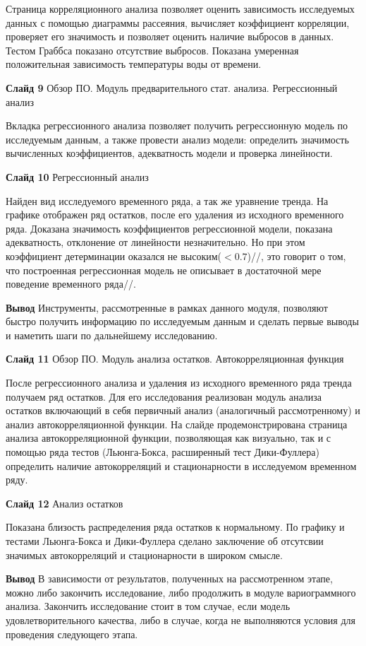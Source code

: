 \documentclass[a4paper,10pt]{report}
\begin{document}
Страница корреляционного анализа позволяет оценить зависимость исследуемых данных с помощью диаграммы рассеяния, вычисляет коэффициент корреляции, проверяет его значимость и позволяет оценить наличие выбросов в данных. Тестом Граббса показано отсутствие выбросов. Показана умеренная положительная зависимость температуры воды от времени.

\textbf{Слайд 9} Обзор ПО. Модуль предварительного стат. анализа. Регрессионный анализ

Вкладка регрессионного анализа позволяет получить регрессионную модель по исследуемым данным, а также провести анализ модели: определить значимость вычисленных коэффициентов, адекватность модели и проверка линейности.

\textbf{Слайд 10} Регрессионный анализ

Найден вид исследуемого временного ряда, а так же уравнение тренда. На графике отображен ряд остатков, после его удаления из исходного временного ряда. Доказана значимость коэффициентов регрессионной модели, показана адекватность, отклонение от линейности незначительно. Но при этом коэффициент детерминации оказался не высоким($<0.7$)//, это говорит о том, что построенная регрессионная модель не описывает в достаточной мере поведение временного ряда//.

\textbf{Вывод} Инструменты, рассмотренные в рамках данного модуля, позволяют быстро получить информацию по исследуемым данным и сделать первые выводы и наметить шаги по дальнейшему исследованию.

\textbf{Слайд 11} Обзор ПО. Модуль анализа остатков. Автокорреляционная функция

После регрессионного анализа и удаления из исходного временного ряда тренда получаем ряд остатков. Для его исследования реализован модуль анализа остатков включающий в себя первичный анализ (аналогичный рассмотренному) и анализ автокорреляционной функции. На слайде продемонстрирована страница анализа автокорреляционной функции, позволяющая как визуально, так и с помощью ряда тестов (Льюнга-Бокса, расширенный тест Дики-Фуллера) определить наличие автокорреляций и стационарности в исследуемом временном ряду.

\textbf{Слайд 12} Анализ остатков

Показана близость распределения ряда остатков к нормальному. По графику и тестами Льюнга-Бокса и Дики-Фуллера сделано заключение об отсутсвии значимых автокорреляций и стационарности в широком смысле.

\textbf{Вывод} В зависимости от результатов, полученных на рассмотренном этапе, можно либо закончить исследование, либо продолжить в модуле вариограммного анализа. Закончить исследование стоит в том случае, если модель удовлетворительного качества, либо в случае, когда не выполняются условия для проведения следующего этапа.
\end{document}
